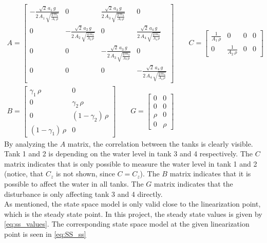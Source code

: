 \begin{equation}
    \begin{gathered}
        A=\begin{bmatrix}
        -\frac{\sqrt{2}\,a_1\,g}{2\,A_1\,\sqrt{\frac{g\,m_1}{A_1\,\rho}}} & 0 & \frac{\sqrt{2}\,a_3\,g}{2\,A_3\,\sqrt{\frac{g\,m_3}{A_3\,\rho}}} & 0\\
        0 & -\frac{\sqrt{2}\,a_2\,g}{2\,A_2\,\sqrt{\frac{g\,m_2}{A_2\,\rho}}} & 0 & \frac{\sqrt{2}\,a_4\,g}{2\,A_4\,\sqrt{\frac{g\,m_4}{A_4\,\rho}}}\\
        0 & 0 & -\frac{\sqrt{2}\,a_3\,g}{2\,A_3\,\sqrt{\frac{g\,m_3}{A_3\,\rho}}} & 0\\
        0 & 0 & 0 & -\frac{\sqrt{2}\,a_4\,g}{2\,A_4\,\sqrt{\frac{g\,m_4}{A_4\,\rho}}}
        \end{bmatrix} \qquad
        C=\begin{bmatrix}
            \frac{1}{A_1\,\rho} & 0 & 0 & 0\\
            0 & \frac{1}{A_2\,\rho} & 0 & 0
        \end{bmatrix} \\
        B=\begin{bmatrix}
        \gamma_1\,\rho & 0\\
        0 & \gamma_2\,\rho\\
        0 & (1-\gamma_2)\,\rho\\
        (1-\gamma_1)\,\rho & 0
        \end{bmatrix} \qquad
        G=\begin{bmatrix}
            0 & 0\\
            0 & 0\\
            \rho & 0\\
            0 & \rho
        \end{bmatrix} 
    \end{gathered}
\end{equation}
By analyzing the $A$ matrix, the correlation between the tanks is clearly visible. Tank 1 and 2 is depending on the water level in tank 3 and 4 respectively. The $C$ matrix indicates that is only possible to measure the water level in tank 1 and 2 (notice, that $C_z$ is not shown, since $C=C_z$). The $B$ matrix indicates that it is possible to affect the water in all tanks. The $G$ matrix indicates that the disturbance is only affecting tank 3 and 4 directly.\\
As mentioned, the state space model is only valid close to the linearization point, which is the steady state point. In this project, the steady state values is given by \cref{eq:ss_values}. The corresponding state space model at the given linearization point is seen in \cref{eq:SS_ss}
